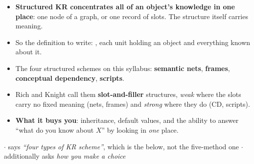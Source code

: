 {\begin{itemize}
{        many separate clauses}. Nothing in the formalism ties them together.
  \item \textbf{Structured KR concentrates all of an object's knowledge in one place}: one
        node of a graph, or one record of slots. The structure itself carries meaning.
  \item So the definition to write: , each unit holding
        an object and everything known about it.
  \item The four structured schemes on this syllabus: \textbf{semantic nets},
        \textbf{frames}, \textbf{conceptual dependency}, \textbf{scripts}.
  \item Rich and Knight call them \textbf{slot-and-filler} structures, \emph{weak} where
        the slots carry no fixed meaning (nets, frames) and \emph{strong} where they do
        (CD, scripts).
  \item \textbf{What it buys you}: inheritance, default values, and the ability to answer
        ``what do you know about $X$'' by looking in \emph{one} place.
\end{itemize}}


{\color{sub}\footnotesize {}  \gap$\cdot$\gap
{} says \emph{``four types of KR scheme''}, which is the
 below, not the five-method one \gap$\cdot$\gap
{} additionally asks \emph{how you make a choice}}

